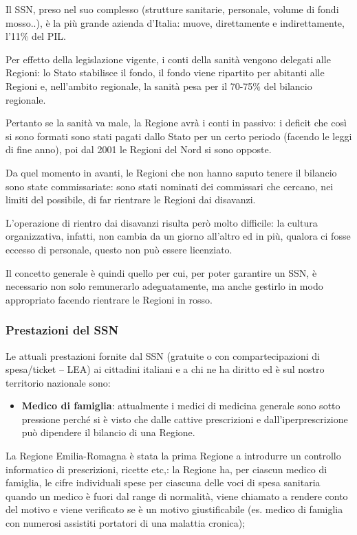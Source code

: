 Il SSN, preso nel suo complesso (strutture sanitarie, personale, volume
di fondi mosso..), è la più grande azienda d'Italia: muove, direttamente
e indirettamente, l'11\% del PIL.

Per effetto della legislazione vigente, i conti della sanità vengono
delegati alle Regioni: lo Stato stabilisce il fondo, il fondo viene
ripartito per abitanti alle Regioni e, nell'ambito regionale, la sanità
pesa per il 70-75\% del bilancio regionale.

Pertanto se la sanità va male, la Regione avrà i conti in passivo: i
deficit che così si sono formati sono stati pagati dallo Stato per un
certo periodo (facendo le leggi di fine anno), poi dal 2001 le Regioni
del Nord si sono opposte.

Da quel momento in avanti, le Regioni che non hanno saputo tenere il
bilancio sono state commissariate: sono stati nominati dei commissari
che cercano, nei limiti del possibile, di far rientrare le Regioni dai
disavanzi.

L'operazione di rientro dai disavanzi risulta però molto difficile: la
cultura organizzativa, infatti, non cambia da un giorno all'altro ed in
più, qualora ci fosse eccesso di personale, questo non può essere
licenziato.

Il concetto generale è quindi quello per cui, per poter garantire un
SSN, è necessario non solo remunerarlo adeguatamente, ma anche gestirlo
in modo appropriato facendo rientrare le Regioni in rosso.

\subsubsection{Prestazioni del SSN}

Le attuali prestazioni fornite dal SSN (gratuite o con compartecipazioni
di spesa/ticket -- LEA) ai cittadini italiani e a chi ne ha diritto ed è
sul nostro territorio nazionale sono:

\begin{itemize}
\item
  \textbf{Medico di famiglia}: attualmente i medici di medicina generale
  sono sotto pressione perché si è visto che dalle cattive prescrizioni
  e dall'iperprescrizione può dipendere il bilancio di una Regione.
\end{itemize}

La Regione Emilia-Romagna è stata la prima Regione a introdurre un controllo informatico di prescrizioni, ricette etc,: la Regione ha, per ciascun medico di famiglia, le cifre individuali spese per ciascuna delle voci di spesa sanitaria quando un medico è fuori dal range di normalità, viene chiamato a rendere conto del motivo e viene verificato se è un motivo giustificabile (es. medico di famiglia con numerosi assistiti portatori di una malattia cronica);

